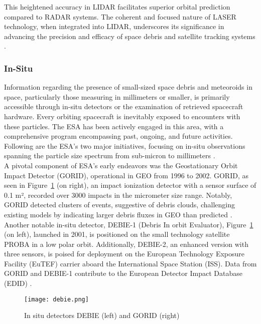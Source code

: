 This heightened accuracy in LIDAR facilitates superior orbital prediction compared to RADAR systems. The coherent and focused nature of LASER technology, when integrated into LIDAR, underscores its significance in advancing the precision and efficacy of space debris and satellite tracking systems \cite{optical}.\\



\subsubsection{In-Situ}

Information regarding the presence of small-sized space debris and meteoroids in space, particularly those measuring in millimeters or smaller, is primarily accessible through in-situ detectors or the examination of retrieved spacecraft hardware. Every orbiting spacecraft is inevitably exposed to encounters with these particles. The ESA has been actively engaged in this area, with a comprehensive program encompassing past, ongoing, and future activities. Following are the ESA's two major initiatives, focusing on in-situ observations spanning the particle size spectrum from sub-micron to millimeters \cite{situ}.\\

A pivotal component of ESA's early endeavors was the Geostationary Orbit Impact Detector (GORID), operational in GEO from 1996 to 2002. GORID, as seen in Figure~\ref{fig:debiee} (on right), an impact ionization detector with a sensor surface of 0.1 m², recorded over 3000 impacts in the micrometer size range. Notably, GORID detected clusters of events, suggestive of debris clouds, challenging existing models by indicating larger debris fluxes in GEO than predicted \cite{gorid1,gorid2,gorid3}. Another notable in-situ detector, DEBIE-1 (Debris In orbit Evaluator), Figure~\ref{fig:debiee} (on left), launched in 2001, is positioned on the small technology satellite PROBA in a low polar orbit. Additionally, DEBIE-2, an enhanced version with three sensors, is poised for deployment on the European Technology Exposure Facility (EuTEF) carrier aboard the International Space Station (ISS). Data from GORID and DEBIE-1 contribute to the European Detector Impact Database (EDID) \cite{gorid2,gorid3,debie}.\\

\begin{figure}[H]
	\centering
	\texttt{[image: debie.png]}
	\caption{In situ detectors DEBIE (left) \cite{deb} and GORID (right) \cite{god}}\label{fig:debiee}
\end{figure}

